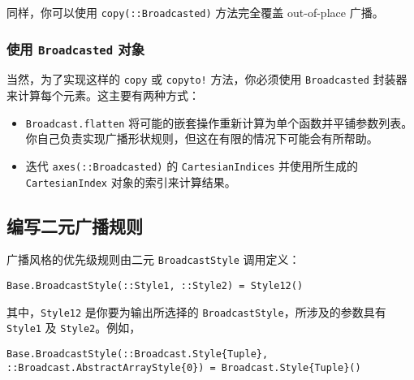 同样，你可以使用 \texttt{copy(::Broadcasted)} 方法完全覆盖 out-of-place 广播。



\hypertarget{2171470859232296256}{}


\subsubsection{使用 \texttt{Broadcasted} 对象}



当然，为了实现这样的 \texttt{copy} 或 \texttt{copyto!} 方法，你必须使用 \texttt{Broadcasted} 封装器来计算每个元素。这主要有两种方式：



\begin{itemize}
\item \texttt{Broadcast.flatten} 将可能的嵌套操作重新计算为单个函数并平铺参数列表。你自己负责实现广播形状规则，但这在有限的情况下可能会有所帮助。


\item 迭代 \texttt{axes(::Broadcasted)} 的 \texttt{CartesianIndices} 并使用所生成的 \texttt{CartesianIndex} 对象的索引来计算结果。

\end{itemize}


\hypertarget{13308248870533973226}{}


\subsection{编写二元广播规则}



广播风格的优先级规则由二元 \texttt{BroadcastStyle} 调用定义：




\begin{verbatim}
Base.BroadcastStyle(::Style1, ::Style2) = Style12()
\end{verbatim}



其中，\texttt{Style12} 是你要为输出所选择的 \texttt{BroadcastStyle}，所涉及的参数具有 \texttt{Style1} 及 \texttt{Style2}。例如，




\begin{verbatim}
Base.BroadcastStyle(::Broadcast.Style{Tuple}, ::Broadcast.AbstractArrayStyle{0}) = Broadcast.Style{Tuple}()
\end{verbatim}



